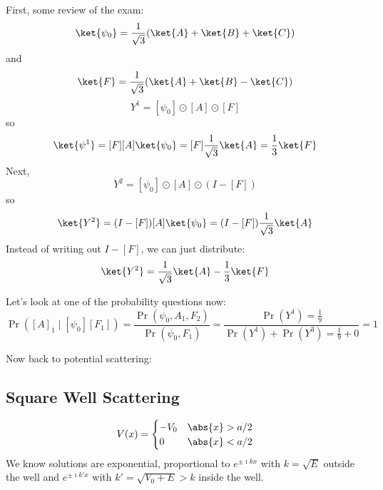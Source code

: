 \documentclass[a4paper,twoside,master.tex]{subfiles}
\begin{document}

First, some review of the exam:
\begin{equation}
    \ket{\psi_0} = \frac{1}{\sqrt{3}} (\ket{A} + \ket{B} + \ket{C})
\end{equation}
and
\begin{equation}
    \ket{F} = \frac{1}{\sqrt{3}} (\ket{A} + \ket{B} - \ket{C})
\end{equation}
\begin{equation}
    Y^1 = [\psi_0]\odot[A]\odot[F]
\end{equation}
so
\begin{equation}
    \ket{\psi^1} = [F][A] \ket{\psi_0} = [F] \frac{1}{\sqrt{3}} \ket{A} = \frac{1}{3} \ket{F}
\end{equation}
Next,
\begin{equation}
    Y^2 = [\psi_0]\odot[A]\odot(I-[F])
\end{equation}
so
\begin{equation}
    \ket{Y^2} = (I-[F])[A] \ket{\psi_0} = (I-[F]) \frac{1}{\sqrt{3}} \ket{A} 
\end{equation}
Instead of writing out $ I - [F] $, we can just distribute:
\begin{equation}
    \ket{Y^2} = \frac{1}{\sqrt{3}} \ket{A} - \frac{1}{3} \ket{F}
\end{equation}

Let's look at one of the probability questions now:
\begin{equation}
    \Pr([A]_1\mid[\psi_0][F_1]) = \frac{\Pr(\psi_0,A_1,F_2)}{\Pr(\psi_0,F_1)} = \frac{\Pr(Y^1) = \frac{1}{9}}{\Pr(Y^1)+\Pr(Y^3) = \frac{1}{9} + 0} = 1
\end{equation}

Now back to potential scattering:

\subsection{Square Well Scattering}
\label{sub:square_well_scattering}

\begin{equation}
    V(x) = \begin{cases} -V_0 & \abs{x} > a/2 \\ 0 & \abs{x} < a/2 \end{cases}
\end{equation}
We know solutions are exponential, proportional to $ e^{\pm\imath kx} $ with $ k = \sqrt{E} $ outside the well and $ e^{\pm\imath k'x} $ with $ k' = \sqrt{V_0 + E} > k $ inside the well.
\end{document}
